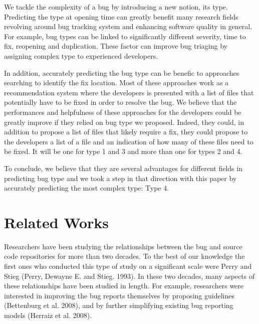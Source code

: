 \documentclass[natbib]{svjour3}
\begin{document}
We tackle the complexity of a bug by introducing a new notion, its type.
Predicting the type at opening time can greatly benefit many research
fields revolving around bug tracking system and enhancing software
quality in general. For example, bug types can be linked to
significantly different severity, time to fix, reopening and
duplication. These factor can improve bug triaging by assigning complex
type to experienced developers.

In addition, accurately predicting the bug type can be benefic to
approaches searching to identify the fix location. Most of these
approaches work as a recommendation system where the developers is
presented with a list of files that potentially have to be fixed in
order to resolve the bug. We believe that the performances and
helpfulness of these approaches for the developers could be greatly
improve if they relied on bug type we proposed. Indeed, they could, in
addition to propose a list of files that likely require a fix, they
could propose to the developers a list of a file and an indication of
how many of these files need to be fixed. It will be one for type 1 and
3 and more than one for types 2 and 4.

To conclude, we believe that they are several advantages for different
fields in predicting bug type and we took a step in that direction with
this paper by accurately predicting the most complex type: Type 4.

\section{Related Works}\label{related-works}

Researchers have been studying the relationships between the bug and
source code repositories for more than two decades. To the best of our
knowledge the first ones who conducted this type of study on a
significant scale were Perry and Stieg (Perry, Dewayne E. and Stieg.
1993). In these two decades, many aspects of these relationships have
been studied in length. For example, researchers were interested in
improving the bug reports themselves by proposing guidelines (Bettenburg
et al. 2008), and by further simplifying existing bug reporting models
(Herraiz et al. 2008).
\end{document}
